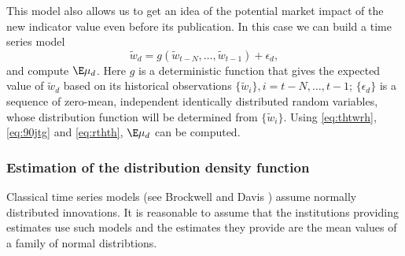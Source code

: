\documentclass[a4paper,11pt,pdftex,twoside,titlepage]{article}
\begin{document}
This model also allows us to get an idea of the potential market
impact of the new indicator value even before its publication. In this
case we can build a time series model
\begin{equation}
  \label{eq:rthth}
  \tilde w_d = g(\tilde w_{t-N}, \dots, \tilde w_{t-1}) + \epsilon_d,
\end{equation}
and compute $\E \mu_d$. Here $g$ is a deterministic function that
gives the expected value of $\tilde w_d$ based on its historical
observations $\{\tilde w_i\}, i=t-N, \dots, t-1$; $\{\epsilon_d\}$ is
a sequence of zero-mean, independent identically distributed random
variables, whose distribution function will be determined from
$\{\tilde w_i\}$. Using \eqref{eq:thtwrh}, \eqref{eq:90jtg} and
\eqref{eq:rthth}, $\E \mu_d$ can be computed.


\subsubsection{Estimation of the distribution density function}
Classical time series models (see Brockwell and Davis
\cite{Brockwell1991}) assume normally 
distributed innovations. It is reasonable to assume that the
institutions providing estimates use such models and the estimates
they provide are the mean values of a family of normal distribtions.
\end{document}
